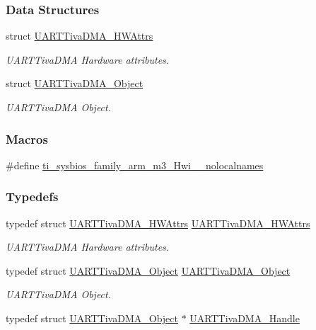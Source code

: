 \subsubsection*{Data Structures}
\begin{DoxyCompactItemize}
\item 
struct \hyperlink{struct_u_a_r_t_tiva_d_m_a___h_w_attrs}{U\+A\+R\+T\+Tiva\+D\+M\+A\+\_\+\+H\+W\+Attrs}
\begin{DoxyCompactList}\small\item\em U\+A\+R\+T\+Tiva\+D\+M\+A Hardware attributes. \end{DoxyCompactList}\item 
struct \hyperlink{struct_u_a_r_t_tiva_d_m_a___object}{U\+A\+R\+T\+Tiva\+D\+M\+A\+\_\+\+Object}
\begin{DoxyCompactList}\small\item\em U\+A\+R\+T\+Tiva\+D\+M\+A Object. \end{DoxyCompactList}\end{DoxyCompactItemize}
\subsubsection*{Macros}
\begin{DoxyCompactItemize}
\item 
\#define \hyperlink{_u_a_r_t_tiva_d_m_a_8h_aaa17ecf48f5762e2e1bdb0bab8aacf0c}{ti\+\_\+sysbios\+\_\+family\+\_\+arm\+\_\+m3\+\_\+\+Hwi\+\_\+\+\_\+nolocalnames}
\end{DoxyCompactItemize}
\subsubsection*{Typedefs}
\begin{DoxyCompactItemize}
\item 
typedef struct \hyperlink{struct_u_a_r_t_tiva_d_m_a___h_w_attrs}{U\+A\+R\+T\+Tiva\+D\+M\+A\+\_\+\+H\+W\+Attrs} \hyperlink{_u_a_r_t_tiva_d_m_a_8h_a62a00b7172f6bfef1637841c7c126627}{U\+A\+R\+T\+Tiva\+D\+M\+A\+\_\+\+H\+W\+Attrs}
\begin{DoxyCompactList}\small\item\em U\+A\+R\+T\+Tiva\+D\+M\+A Hardware attributes. \end{DoxyCompactList}\item 
typedef struct \hyperlink{struct_u_a_r_t_tiva_d_m_a___object}{U\+A\+R\+T\+Tiva\+D\+M\+A\+\_\+\+Object} \hyperlink{_u_a_r_t_tiva_d_m_a_8h_ae68f92de73a22b2cdb1359930e949fc4}{U\+A\+R\+T\+Tiva\+D\+M\+A\+\_\+\+Object}
\begin{DoxyCompactList}\small\item\em U\+A\+R\+T\+Tiva\+D\+M\+A Object. \end{DoxyCompactList}\item 
typedef struct \hyperlink{struct_u_a_r_t_tiva_d_m_a___object}{U\+A\+R\+T\+Tiva\+D\+M\+A\+\_\+\+Object} $\ast$ \hyperlink{_u_a_r_t_tiva_d_m_a_8h_ad1591b2fa5d54f24f2acf1920788b015}{U\+A\+R\+T\+Tiva\+D\+M\+A\+\_\+\+Handle}
\end{DoxyCompactItemize}
